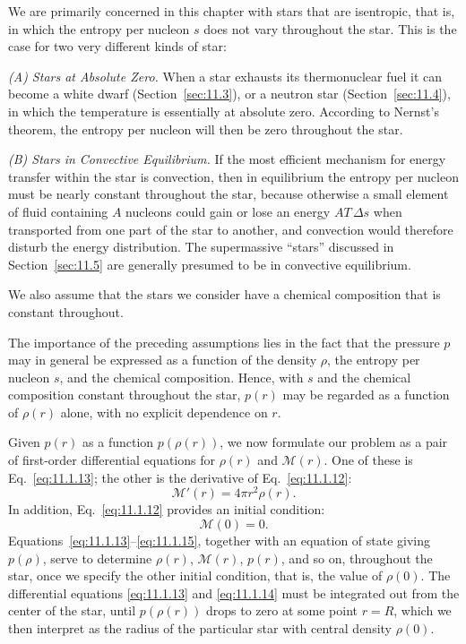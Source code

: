 We are primarily concerned in this chapter with stars that are isentropic,
that is, in which the entropy per nucleon \(s\) does not vary throughout the
star. This is the case for two very different kinds of star:

\emph{(A) Stars at Absolute Zero.} When a star exhausts its thermonuclear fuel
it can become a white dwarf (Section~\ref{sec:11.3}), or a neutron star
(Section~\ref{sec:11.4}), in which the temperature is essentially at absolute
zero. According to Nernst's theorem, the entropy per nucleon will then be zero
throughout the star.

\emph{(B) Stars in Convective Equilibrium.} If the most efficient mechanism
for energy transfer within the star is convection, then in equilibrium the
entropy per nucleon must be nearly constant throughout the star, because
otherwise a small element of fluid containing \(A\) nucleons could gain or
lose an energy \(A T\,\Delta s\) when transported from one part
of the star to another, and convection would therefore disturb the energy
distribution. The supermassive ``stars'' discussed in
Section~\ref{sec:11.5} are generally presumed to be in convective equilibrium.

We also assume that the stars we consider have a chemical composition that is
constant throughout.

The importance of the preceding assumptions lies in the fact that the pressure
\(p\) may in general be expressed as a function of the density \(\rho\), the
entropy per nucleon \(s\), and the chemical composition. Hence, with \(s\) and
the chemical composition constant throughout the star, \(p(r)\) may be
regarded as a function of \(\rho(r)\) alone, with no explicit dependence on
\(r\).

Given \(p(r)\) as a function \(p(\rho(r))\), we now formulate our problem as a
pair of first-order differential equations for \(\rho(r)\) and
\(\mathcal{M}(r)\). One of these is Eq.~\eqref{eq:11.1.13}; the other is the
derivative of Eq.~\eqref{eq:11.1.12}:
\begin{equation}
  \mathcal{M}'(r)=4\pi r^2\rho(r).
  \tag{11.1.14}\label{eq:11.1.14}
\end{equation}
In addition, Eq.~\eqref{eq:11.1.12} provides an initial condition:
\begin{equation}
  \mathcal{M}(0)=0.
  \tag{11.1.15}\label{eq:11.1.15}
\end{equation}
Equations~\eqref{eq:11.1.13}--\eqref{eq:11.1.15}, together with an equation
of state giving \(p(\rho)\), serve to determine \(\rho(r)\),
\(\mathcal{M}(r)\), \(p(r)\), and so on, throughout the star, once we specify
the other initial condition, that is, the value of \(\rho(0)\). The
differential equations \eqref{eq:11.1.13} and \eqref{eq:11.1.14} must be
integrated out from the center of the star, until \(p(\rho(r))\) drops to zero
at some point \(r=R\), which we then interpret as the radius of the particular
star with central density \(\rho(0)\).

